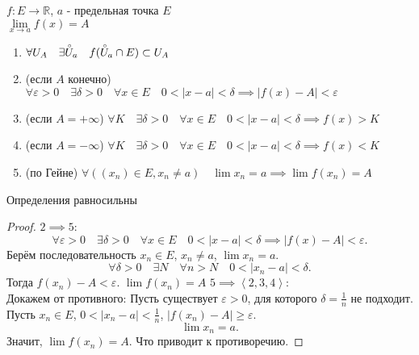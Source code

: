 \documentclass[11pt, oneside]{article}   	%
\begin{document}
        \begin{definition}
            $f: E \to \mathbb{R}$, $a$ - предельная точка $E$\\
            $\lim\limits_{x \to a} f(x) = A$\\
            \begin{enumerate}
                \item $\forall{U_A}\quad \exists{\accentset{\circ}{U}_a}\quad f(\accentset{\circ}{U}_a\cap E) \subset U_A$
                \item (если $A$ конечно) $\forall{\varepsilon > 0}\quad \exists{\delta > 0}\quad \forall{x\in E}\quad 0 < |x-a| < \delta \implies |f(x) - A| < \varepsilon$
                \item (если $A=+\infty$) $\forall{K}\quad \exists{\delta>0}\quad \forall{x\in E}\quad 0<|x-a|<\delta \implies f(x) > K$
                \item (если $A=-\infty$) $\forall{K}\quad \exists{\delta>0}\quad \forall{x\in E}\quad 0<|x-a|<\delta \implies f(x) < K$
                \item (по Гейне) $\forall{((x_n)\in E, x_n \neq a)}\quad \lim x_n = a \implies \lim f(x_n) = A$
            \end{enumerate}
        \end{definition}
        \begin{theorem}
            Определения равносильны
            \begin{proof}
                $2 \implies 5$:\\
                \[ \forall{\varepsilon>0}\quad \exists{\delta>0}\quad \forall{x\in E}\quad 0<|x-a|<\delta \implies |f(x)-A|<\varepsilon .\] 
                Берём последовательность $x_n\in E$, $x_n \neq  a$, $\lim x_n = a$.\\
                \[ \forall{\delta > 0}\quad \exists{N}\quad \forall{n>N}\quad 0 < |x_n-a|<\delta .\]
                Тогда $f(x_n)-A<\varepsilon$. $\lim f(x_n) = A$
                 $5 \implies \left<2, 3, 4\right>$:\\
                Докажем от противного:
                Пусть существует $\varepsilon>0$, для которого $\delta=\frac{1}{n}$ не подходит.\\
                Пусть $x_n\in E$, $0<|x_n-a|<\frac{1}{n}$, $|f(x_n)-A|\ge \varepsilon$.\\
                \[ \lim x_n = a .\]
                Значит, $\lim f(x_n) = A$. Что приводит к противоречию.
            \end{proof}
        \end{theorem}
\end{document}
